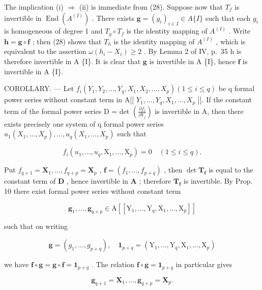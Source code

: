 The implication (i) \(\Rightarrow\) (ii) is immediate from (28). Suppose now that \(T_{f}\) is invertible in \(\operatorname{End}(A^{(I)})\) . There exists \(\mathbf{g} = (g_i)_{i \in I} \in A\{I\}\) such that each \(g_i\) is homogeneous of degree 1 and \(T_{g} \circ T_{f}\) is the identity mapping of \(A^{(I)}\) . Write \(\mathbf{h} = \mathbf{g} \circ \mathbf{f}\) ; then (28) shows that \(T_{h}\) is the identity mapping of \(A^{(I)}\) , which is equivalent to the assertion \(\omega(h_i - X_i) \geqslant 2\) . By Lemma 2 of IV, p.~35 h is therefore invertible in A \{I\}. It is clear that \(\mathbf{g}\) is invertible in A \{I\}, hence \(\mathbf{f}\) is invertible in A \{I\}.

COROLLARY. --- Let \(f_{i}(Y_{1}, Y_{2}, \ldots, Y_{q}, X_{1}, X_{2}, \ldots, X_{p}) (1 \leqslant i \leqslant q)\) be q formal power series without constant term in A{[}{[} \(Y_{1}, \ldots, Y_{q}, X_{1}, \ldots, X_{p}\) {]}{]}. If the constant term of the formal power series D = det \(\left(\frac{\partial f_{i}}{\partial Y_{j}}\right)\) is invertible in A, then there exists precisely one system of q formal power series \(u_{1}(X_{1}, \ldots, X_{p}), \ldots, u_{q}(X_{1}, \ldots, X_{p})\) such that

\[
f _ {i} (u _ {1}, \dots , u _ {q}, \mathrm{X} _ {1}, \dots , \mathrm{X} _ {p}) = 0 \quad (1 \leqslant i \leqslant q).\tag{29}
\]

Put \(f_{q+1} = \mathbf{X}_1, \ldots, f_{q+p} = \mathbf{X}_p\) , \(\mathbf{f} = (f_1, \ldots, f_{p+q})\) , then \(\det \mathbf{T}_{\mathbf{f}}\) is equal to the constant term of \(\mathbf{D}\) , hence invertible in \(\mathbf{A}\) ; therefore \(\mathbf{T}_{\mathbf{f}}\) is invertible. By Prop. 10 there exist formal power series without constant term

\[
\boldsymbol {g} _ {1}, \dots , \boldsymbol {g} _ {q + p} \in \mathrm{A} \left[ \left[ \mathrm{Y} _ {1}, \dots , \mathrm{Y} _ {q}, \mathrm{X} _ {1}, \dots , \mathrm{X} _ {p} \right] \right]
\]

such that on writing

\[
\mathbf {g} = \left(g _ {1}, \dots , g _ {p + q}\right), \quad \mathbf {1} _ {p + q} = \left(\mathrm{Y} _ {1}, \dots , \mathrm{Y} _ {q}, \mathrm{X} _ {1}, \dots , \mathrm{X} _ {p}\right)
\]

we have \(\mathbf{f} \circ \mathbf{g} = \mathbf{g} \circ \mathbf{f} = \mathbf{1}_{p + q}\) . The relation \(\mathbf{f} \circ \mathbf{g} = \mathbf{1}_{p + q}\) in particular gives

\[
\boldsymbol {g} _ {q + 1} = \mathbf {X} _ {1}, \dots , \boldsymbol {g} _ {q + p} = \mathbf {X} _ {p}.
\]

